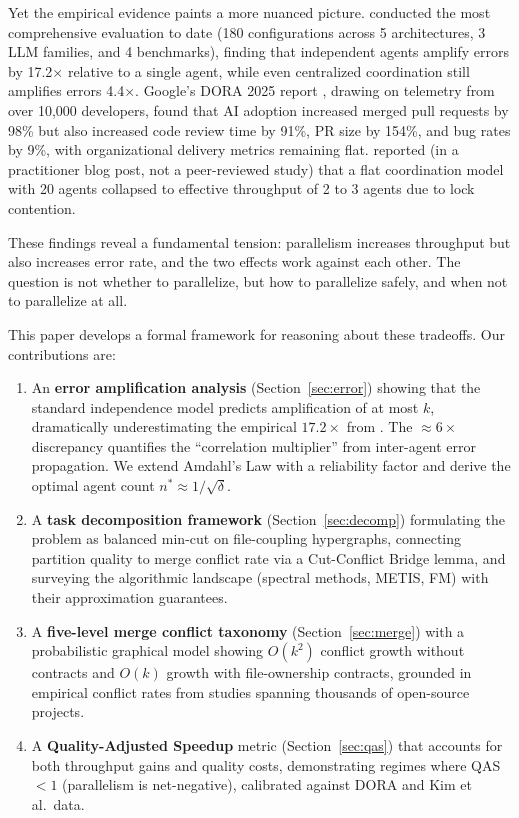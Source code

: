 \documentclass[11pt]{article}
\theoremstyle{definition}
\theoremstyle{remark}
\begin{document}
Yet the empirical evidence paints a more nuanced picture.
\citet{Kim2025} conducted the most comprehensive evaluation to date (180 configurations across 5 architectures, 3 LLM families, and 4 benchmarks), finding that independent agents amplify errors by 17.2$\times$ relative to a single agent, while even centralized coordination still amplifies errors 4.4$\times$.
Google's DORA 2025 report \citep{DORA2025}, drawing on telemetry from over 10,000 developers, found that AI adoption increased merged pull requests by 98\% but also increased code review time by 91\%, PR size by 154\%, and bug rates by 9\%, with organizational delivery metrics remaining flat.
\citet{Cursor2026} reported (in a practitioner blog post, not a peer-reviewed study) that a flat coordination model with 20 agents collapsed to effective throughput of 2 to 3 agents due to lock contention.

These findings reveal a fundamental tension: parallelism increases throughput but also increases error rate, and the two effects work against each other.
The question is not whether to parallelize, but how to parallelize safely, and when not to parallelize at all.

This paper develops a formal framework for reasoning about these tradeoffs.
Our contributions are:

\begin{enumerate}[label=(\arabic*)]
  \item An \textbf{error amplification analysis} (Section~\ref{sec:error}) showing that the standard independence model predicts amplification of at most $k$, dramatically underestimating the empirical $17.2\times$ from \citet{Kim2025}. The $\approx 6\times$ discrepancy quantifies the ``correlation multiplier'' from inter-agent error propagation. We extend Amdahl's Law with a reliability factor and derive the optimal agent count $n^* \approx 1/\sqrt{\delta}$.

  \item A \textbf{task decomposition framework} (Section~\ref{sec:decomp}) formulating the problem as balanced min-cut on file-coupling hypergraphs, connecting partition quality to merge conflict rate via a Cut-Conflict Bridge lemma, and surveying the algorithmic landscape (spectral methods, METIS, FM) with their approximation guarantees.

  \item A \textbf{five-level merge conflict taxonomy} (Section~\ref{sec:merge}) with a probabilistic graphical model showing $O(k^2)$ conflict growth without contracts and $O(k)$ growth with file-ownership contracts, grounded in empirical conflict rates from studies spanning thousands of open-source projects.

  \item A \textbf{Quality-Adjusted Speedup} metric (Section~\ref{sec:qas}) that accounts for both throughput gains and quality costs, demonstrating regimes where QAS $< 1$ (parallelism is net-negative), calibrated against DORA and Kim et al.\ data.
\end{enumerate}
\end{document}
